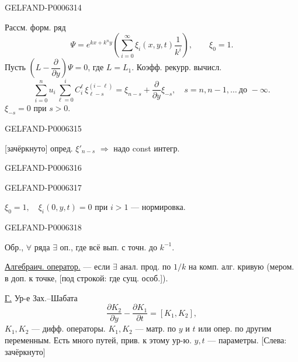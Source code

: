 \begin{GelfandAdjacentEvidence}{GELFAND-P000631}{4}


Рассм. форм. ряд
\begin{equation*}
\Psi=e^{kx+k^ny}\left(\sum_{i=0}^{\infty}\xi_i(x,y,t)\frac{1}{k^i}\right),
\qquad \xi_0=1.\tag{2}
\end{equation*}
Пусть \(\left(L-\dfrac{\partial}{\partial y}\right)\Psi=0\), где \(L=L_1\).
Коэфф. рекурр. вычисл.
\begin{equation*}
\sum_{i=0}^n u_i\sum_{\ell=0}^i C_i^\ell\,\xi_{\ell-s}^{(i-\ell)}
=\xi_{n-s}+\frac{\partial}{\partial y}\xi_{-s},
\quad s=n,n-1,\ldots\ \text{до }-\infty.\tag{3}
\end{equation*}
\(\xi_{-s}=0\) при \(s>0\).
\end{GelfandAdjacentEvidence}
\begin{GelfandAdjacentEvidence}{GELFAND-P000631}{5}

[зачёркнуто] опред. \(\xi'_{n-s}\) \(\Rightarrow\) надо const интегр.
\end{GelfandAdjacentEvidence}
\begin{GelfandAdjacentEvidence}{GELFAND-P000631}{6}

\end{GelfandAdjacentEvidence}
\begin{GelfandAdjacentEvidence}{GELFAND-P000631}{7}

\(\xi_0=1,\quad \xi_i(0,y,t)=0\) при \(i>1\) --- нормировка.
\end{GelfandAdjacentEvidence}
\begin{GelfandAdjacentEvidence}{GELFAND-P000631}{8}

Обр., \(\forall\) ряда \(\exists\) оп., где всё вып. с точн. до \(k^{-1}\).

\underline{Алгебраич. оператор.} --- если \(\exists\) анал. прод. по \(1/k\)
на комп. алг. кривую (мером. в доп. к точке, [под строкой: где сущ. особ.]).

\underline{Г.} Ур-е Зах.--Шабата
\[
\frac{\partial K_2}{\partial y}-\frac{\partial K_1}{\partial t}=[K_1,K_2],
\]
\(K_1,K_2\) --- дифф. операторы.
\(K_1,K_2\) --- матр. по \(y\) и \(t\) или опер. по другим переменным.
Есть много путей, прив. к этому ур-ю.
\(y,t\) --- параметры.
[Слева: зачёркнуто]
\end{GelfandAdjacentEvidence}

